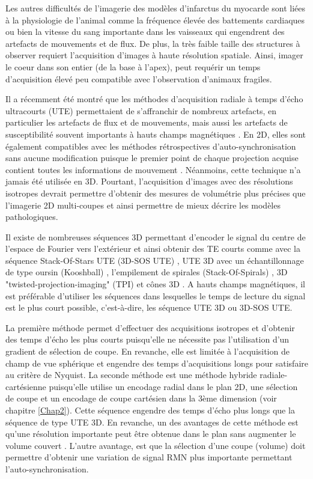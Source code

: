 Les autres difficultés de l’imagerie des modèles d’infarctus du myocarde sont liées à la physiologie de l’animal comme la fréquence élevée des battements cardiaques ou bien la vitesse du sang importante dans les vaisseaux qui engendrent des artefacts de mouvements et de flux. De plus, la très faible taille des structures à observer requiert l’acquisition d’images à haute résolution spatiale. Ainsi, imager le coeur dans son entier (de la base à l’apex), peut requérir un temps d’acquisition élevé peu compatible avec l’observation d’animaux fragiles.

Il a récemment été montré que les méthodes d’acquisition radiale à temps d’écho ultracourts (UTE) permettaient de s’affranchir de nombreux artefacts, en particulier les artefacts de flux et de mouvements, mais aussi les artefacts de susceptibilité souvent importants à hauts champs magnétiques \cite{Hoerr:2013gf,Motaal:2015aa,trotier2015positive}. En 2D, elles sont également compatibles avec les méthodes rétrospectives d’auto-synchronisation sans aucune modification puisque le premier point de chaque projection acquise contient toutes les informations de mouvement \cite{ Hoerr:2013gf}.
Néanmoins, cette technique n’a jamais été utilisée en 3D. Pourtant, l'acquisition d'images avec des résolutions isotropes devrait permettre d’obtenir des mesures de volumétrie plus précises que l’imagerie 2D multi-coupes \cite{sorensen2005three} et ainsi permettre de mieux décrire les modèles pathologiques.

Il existe de nombreuses séquences 3D permettant d’encoder le signal du centre de l’espace de Fourier vers l’extérieur et ainsi obtenir des TE courts comme avec la séquence Stack-Of-Stars UTE (3D-SOS UTE) \cite{glover1992projection}, UTE 3D avec un échantillonnage de type oursin (Kooshball) \cite{glover1992boron}, l'empilement de spirales (Stack-Of-Spirals) \cite{irarrazabal1995fast}, 3D "twisted-projection-imaging" (TPI) \cite{boada1997fast} et cônes 3D \cite{Gurney:2006fk}. A hauts champs magnétiques, il est préférable d’utiliser les séquences dans lesquelles le temps de lecture du signal est le plus court possible, c’est-à-dire, les séquence UTE 3D ou 3D-SOS UTE.

La première méthode permet d'effectuer des acquisitions isotropes et d’obtenir des temps d’écho les plus courts puisqu’elle ne nécessite pas l’utilisation d’un gradient de sélection de coupe. En revanche, elle est limitée à l’acquisition de champ de vue sphérique et engendre des temps d’acquisitions longs pour satisfaire au critère de Nyquist.
La seconde méthode est une méthode hybride radiale-cartésienne puisqu’elle utilise un encodage radial dans le plan 2D, une sélection de coupe et un encodage de coupe cartésien dans la 3ème dimension (voir chapitre \ref{Chap2}). Cette séquence engendre des temps d’écho plus longs que la séquence de type UTE 3D. En revanche, un des avantages de cette méthode est qu’une résolution importante peut être obtenue dans le plan sans augmenter le volume couvert \cite{kadbi20154d}. L’autre avantage, est que la sélection d’une coupe (volume) doit permettre d’obtenir une variation de signal RMN plus importante permettant l’auto-synchronisation.

